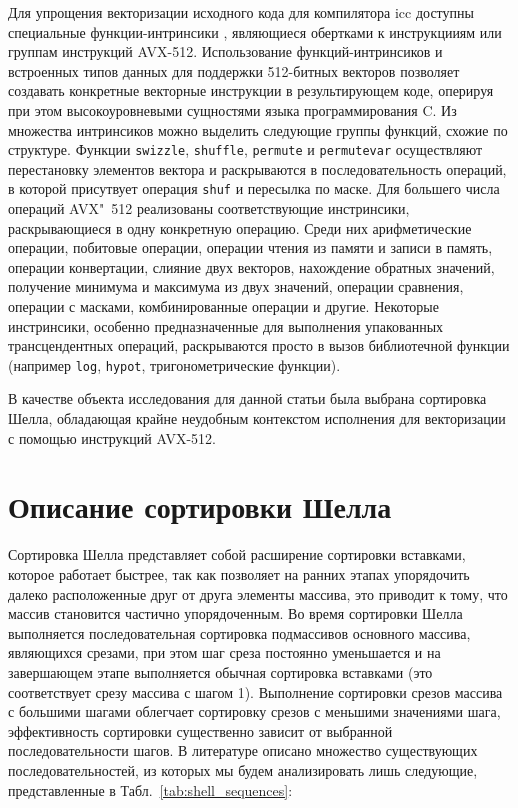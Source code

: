 \documentclass[utf8]{psta}
\begin{document}
Для упрощения векторизации исходного кода для компилятора icc доступны специальные функции-интринсики \cite{compiler_guide, intrinsic_guide}, являющиеся обертками к инструкцииям или группам инструкций AVX-512. 
Использование функций-интринсиков и встроенных типов данных для поддержки 512-битных векторов позволяет создавать конкретные векторные инструкции в результирующем коде, оперируя при этом высокоуровневыми сущностями языка программирования C. 
Из множества интринсиков можно выделить следующие группы функций, схожие по структуре. Функции \texttt{swizzle}, \texttt{shuffle}, \texttt{permute} и \texttt{permutevar} осуществляют перестановку элементов вектора и раскрываются в последовательность операций, в которой присутвует операция \texttt{shuf} и пересылка по маске. Для большего числа операций AVX"~512 реализованы соответствующие инстринсики, раскрывающиеся в одну конкретную операцию. 
Среди них арифметические операции, побитовые операции, операции чтения из памяти и записи в память, операции конвертации, слияние двух векторов, нахождение обратных значений, получение минимума и максимума из двух значений, операции сравнения, операции с масками, комбинированные операции и другие. 
Некоторые инстринсики, особенно предназначенные для выполнения упакованных трансцендентных операций, раскрываются просто в вызов библиотечной функции (например \texttt{log}, \texttt{hypot}, тригонометрические функции).

В качестве объекта исследования для данной статьи была выбрана сортировка Шелла, обладающая крайне неудобным контекстом исполнения для векторизации с помощью инструкций AVX-512. 

\section{Описание сортировки Шелла}

Сортировка Шелла \cite{Knuth} представляет собой расширение сортировки вставками, которое работает быстрее, так как позволяет на ранних этапах упорядочить далеко расположенные друг от друга элементы массива, это приводит к тому, что массив становится частично упорядоченным. 
Во время сортировки Шелла выполняется последовательная сортировка подмассивов основного массива, являющихся срезами, при этом шаг среза постоянно уменьшается и на завершающем этапе выполняется обычная сортировка вставками (это соответствует срезу массива с шагом 1).
Выполнение сортировки срезов массива с большими шагами облегчает сортировку срезов с меньшими значениями шага, эффективность сортировки существенно зависит от выбранной последовательности шагов. 
В литературе описано множество существующих последовательностей, из которых мы будем анализировать лишь следующие, представленные в Табл.~\ref{tab:shell_sequences}:
\end{document}
